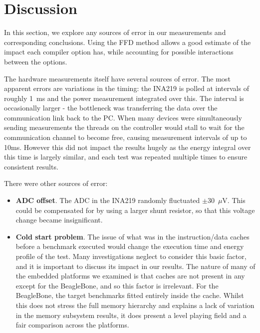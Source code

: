 \documentclass[twocolumn]{article}
\newcommand{\nsection}[1]{\section{\bfseries #1}}
\begin{document}
\nsection{Discussion}

In this section, we explore any sources of error in our measurements and corresponding conclusions.
Using the FFD method allows a good estimate of the impact each compiler option has, while accounting for possible interactions between the options.

The hardware measurements itself have several sources of error. The most apparent errors are variations in the timing: the INA219 is polled at intervals of roughly 1~ms and the power measurement integrated over this. The interval is occasionally larger - the bottleneck was transferring the data over the communication link back to the PC. When many devices were simultaneously sending measurements the threads on the controller would stall to wait for the communication channel to become free, causing measurement intervals of up to 10ms. However this did not impact the results hugely as the energy integral over this time is largely similar, and each test was repeated multiple times to ensure consistent results.

There were other sources of error:
\begin{itemize}
	\item \textbf{ADC offset}. The ADC in the INA219 randomly fluctuated $\pm$30~$\mu$V. This could be compensated for by using a larger shunt resistor, so that this voltage change became insignificant.
	\item \textbf{Cold start problem}. The issue of what was in the instruction/data caches before a benchmark executed would change the execution time and energy profile of the test. Many investigations neglect to consider this basic factor, and it is important to discuss its impact in our results. The nature of many of the embedded platforms we examined is that caches are not present in any except for the BeagleBone, and so this factor is irrelevant. For the BeagleBone, the target benchmarks fitted entirely inside the cache. Whilst this does not stress the full memory hierarchy and explains a lack of variation in the memory subsystem results, it does present a level playing field and a fair comparison across the platforms.
\end{itemize}



\end{document}
